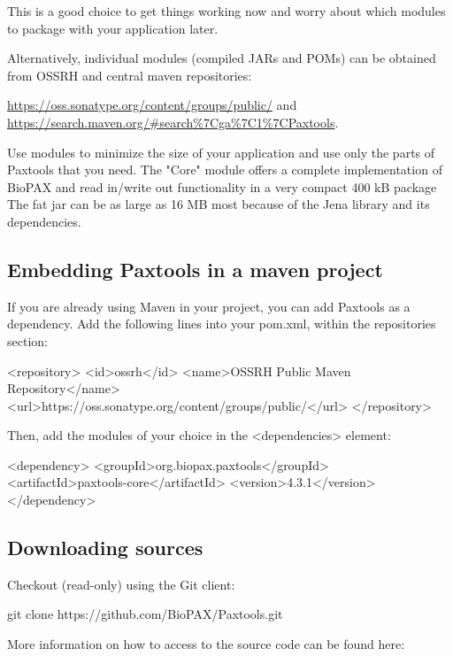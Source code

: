 \documentclass{tufte-book}
\begin{document}
This is a good choice to get things working now and worry about which modules to package with your application later.

Alternatively, individual modules (compiled JARs and POMs) can be obtained from OSSRH and central maven repositories:
	
	\url{https://oss.sonatype.org/content/groups/public/} and \url{https://search.maven.org/#search\%7Cga\%7C1\%7CPaxtools}.

Use modules to minimize the size of your application and use only the parts of Paxtools that you need. The "Core" module offers a complete implementation of BioPAX and read in/write out functionality in a very compact 400 kB package The fat jar can be as large as 16 MB most because of the Jena library and its dependencies.


\subsection{Embedding Paxtools in a maven project}

If you are already using Maven in your project, you can add Paxtools as a dependency.
Add the following lines into your pom.xml, within the repositories section:

\begin{xmlcode}
<repository>
  <id>ossrh</id>
  <name>OSSRH Public Maven Repository</name>
  <url>https://oss.sonatype.org/content/groups/public/</url>
</repository>
\end{xmlcode}

Then, add the modules of your choice in the <dependencies> element:

\begin{xmlcode}
<dependency>
  <groupId>org.biopax.paxtools</groupId>
  <artifactId>paxtools-core</artifactId>
  <version>4.3.1</version>
 </dependency>
\end{xmlcode}


\subsection{Downloading sources}

Checkout (read-only) using the Git client:

\begin{fullwidth}
\begin{xmlcode}
git clone https://github.com/BioPAX/Paxtools.git
\end{xmlcode}
\end{fullwidth}
More information on how to access to the source code can be found here: 	
\end{document}

